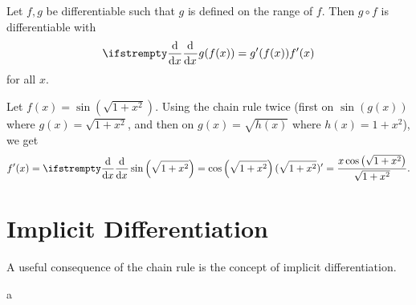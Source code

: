 \documentclass[../calculus.tex]{subfiles}
\begin{document}
\begin{theorem}
  \begin{shaded*}
    Let $f,g$ be differentiable such that $g$ is defined on the range of $f$. Then $g\circ f$ is differentiable with \[\deriv{}{x}g(f(x))=g'(f(x))f'(x)\]
    for all $x$.
  \end{shaded*}
\end{theorem}
\begin{example}
  Let $f(x)=\sin\left(\sqrt{1+x^2}\right)$. Using the chain rule twice (first on $\sin(g(x))$ where $g(x)=\sqrt{1+x^2}$, and then on $g(x)=\sqrt{h(x)}$ where $h(x)=1+x^2$), we get
  \[f'(x)=\deriv{}{x}\sin\left(\sqrt{1+x^2}\right)=\cos\left(\sqrt{1+x^2}\right)(\sqrt{1+x^2})'=\frac{x\cos\left(\sqrt{1+x^2}\right)}{\sqrt{1+x^2}}.\]
\end{example}

\section{Implicit Differentiation}

A useful consequence of the chain rule is the concept of implicit differentiation. 





\newpage

a
\end{document}
